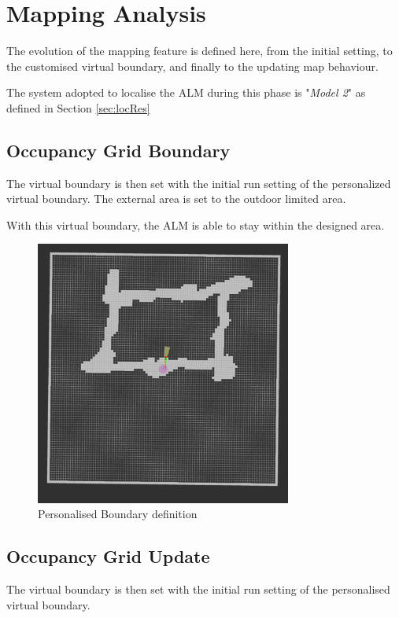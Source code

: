 \section{Mapping Analysis}
\noindent The evolution of the mapping feature is defined here, from the initial setting, to the customised virtual boundary, and finally to the updating map behaviour.

The system adopted to localise the \gls{ALM} during this phase is "\textit{Model 2}" as defined in Section \ref{sec:locRes}


\subsection{Occupancy Grid Boundary}
\noindent
The virtual boundary is then set with the initial run setting of the personalized virtual boundary.
The external area is set to the outdoor limited area.

With this virtual boundary, the \gls{ALM} is able to stay within the designed area.

\begin{figure}[!ht]
	\begin{center}
		\includegraphics[width=0.75\textwidth]{Images/5-Results/BoundaryMap.png}
	\end{center}
	\caption{Personalised Boundary definition}
	\label{fig:occGridBoud}
\end{figure}


\subsection{Occupancy Grid Update}
\noindent
The virtual boundary is then set with the initial run setting of the personalised virtual boundary.


